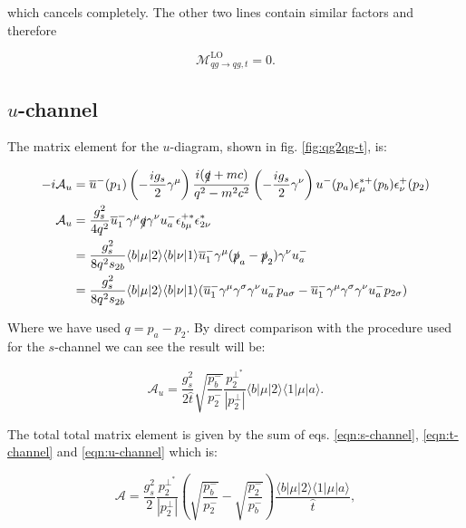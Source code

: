 			which cancels completely.  The other two lines contain similar factors and therefore

			\begin{equation}
				\mathcal{M}_{qg\rightarrow qg, t}^{\text{LO}}=0.
				\label{eqn:t-channel}
			\end{equation}

		\subsection{$u$-channel}

			The matrix element for the $u$-diagram, shown in fig. \eqref{fig:qg2qg-t}, is:

			\begin{equation}
			\begin{split}
			-i\mathcal{A}_u &= \overline{u}^-(p_1)\left(-\frac{ig_s}{2}\gamma^\mu\right)\frac{i(\slashed q+mc)}{q^2-m^2c^2}\left(-\frac{ig_s}{2}\gamma^\nu\right)u^-(p_a)\epsilon_\mu^{*+}(p_b)\epsilon^+_\nu(p_2)\\
			\mathcal{A}_u &= \frac{g_s^2}{4q^2}\overline{u}^-_1\gamma^\mu\slashed q\gamma^\nu u^-_a\epsilon^{+*}_{b\mu}\epsilon^*_{2\nu}\\
			&= \frac{g_s^2}{8q^2s_{2b}}\langle b|\mu|2\rangle\langle b|\nu|1\rangle\overline{u}^-_1\gamma^\mu(\slashed{p}_a-\slashed{p}_2)\gamma^\nu u^-_a\\
			&= \frac{g_s^2}{8q^2s_{2b}}\langle b|\mu|2\rangle\langle b|\nu|1\rangle(\overline{u}^-_1\gamma^\mu\gamma^\sigma\gamma^\nu u^-_ap_{a\sigma} - \overline{u}^-_1\gamma^\mu\gamma^\sigma \gamma^\nu u^-_ap_{2\sigma})
			\end{split}
			\end{equation}

			Where we have used $q=p_a-p_2$.  By direct comparison with the procedure used for the $s$-channel we can see the result will be:

			\begin{equation}
			\mathcal{A}_u=\frac{g_s^2}{2\hat{t}}\sqrt{\frac{p_b^-}{p_2^-}}\frac{p_2^{\perp^*}}{|p_2^\perp|}\langle{b}|\mu|2\rangle\langle{1}|\mu|a\rangle.
			\label{eqn:u-channel}
			\end{equation}

			The total total matrix element is given by the sum of eqs. \eqref{eqn:s-channel}, \eqref{eqn:t-channel} and \eqref{eqn:u-channel} which is:

			\begin{equation}
				\mathcal{A}=\frac{g_s^2}{2}\frac{p_2^{\perp^*}}{|p_2^\perp|}\left(\sqrt{\frac{p_b^-}{p_2^-}}-\sqrt{\frac{p_2^-}{p_b^-}}\right)\frac{\langle{b}|\mu|2\rangle\langle{1}|\mu|a\rangle}{\hat{t}},
				\label{eqn:fullsum}
			\end{equation}

